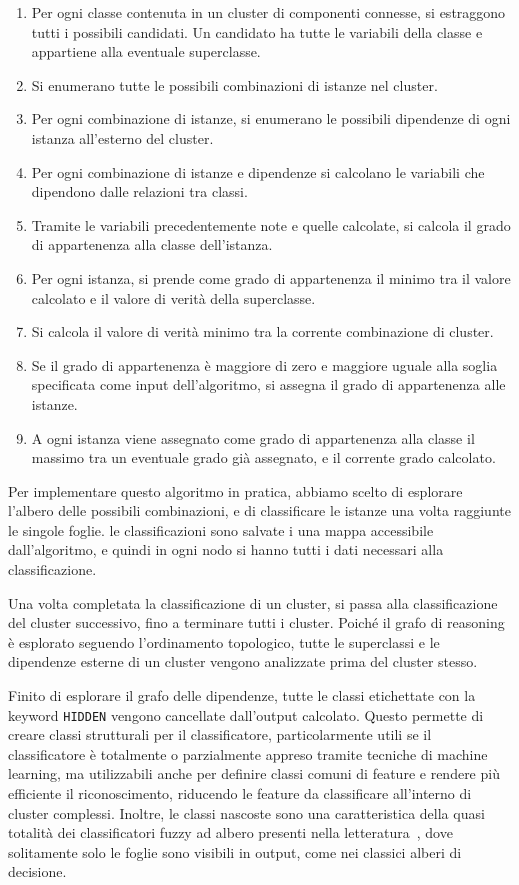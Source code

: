 \begin{enumerate}
 \item Per ogni classe contenuta in un cluster di componenti connesse, si estraggono tutti i possibili candidati. Un candidato ha tutte le variabili della classe e appartiene alla eventuale superclasse.
 \item Si enumerano tutte le possibili combinazioni di istanze nel cluster.
 \item Per ogni combinazione di istanze, si enumerano le possibili dipendenze di ogni istanza all'esterno del cluster.
 \item Per ogni combinazione di istanze e dipendenze si calcolano le variabili che dipendono dalle relazioni tra classi.
 \item Tramite le variabili precedentemente note e quelle calcolate, si calcola il grado di appartenenza alla classe dell'istanza.
 \item Per ogni istanza, si prende come grado di appartenenza il minimo tra il valore calcolato e il valore di verità della superclasse.
 \item Si calcola il valore di verità minimo tra la corrente combinazione di cluster.
 \item Se il grado di appartenenza è maggiore di zero e maggiore uguale alla soglia specificata come input dell'algoritmo, si assegna il grado di appartenenza alle istanze.
 \item A ogni istanza viene assegnato come grado di appartenenza alla classe il massimo tra un eventuale grado già assegnato, e il corrente grado calcolato. 
\end{enumerate}

Per implementare questo algoritmo in pratica, abbiamo scelto di esplorare l'albero delle possibili combinazioni, e di classificare le istanze una volta raggiunte le singole foglie. le classificazioni sono salvate i una mappa accessibile dall'algoritmo, e quindi in ogni nodo si hanno tutti i dati necessari alla classificazione.

Una volta completata la classificazione di un cluster, si passa alla classificazione del cluster successivo, fino a terminare tutti i cluster. Poiché il grafo di reasoning è esplorato seguendo l'ordinamento topologico, tutte le superclassi e le dipendenze esterne di un cluster vengono analizzate prima del cluster stesso.

Finito di esplorare il grafo delle dipendenze, tutte le classi etichettate con la keyword \verb|HIDDEN| vengono cancellate dall'output calcolato. Questo permette di creare classi strutturali per il classificatore, particolarmente utili se il classificatore è totalmente o parzialmente appreso tramite tecniche di machine learning, ma utilizzabili anche per definire classi comuni di feature e rendere più efficiente il riconoscimento, riducendo le feature da classificare all'interno di cluster complessi. Inoltre, le classi nascoste sono una caratteristica della quasi totalità dei classificatori fuzzy ad albero presenti nella letteratura~\cite{Yuan1995125}, dove solitamente solo le foglie sono visibili in output, come nei classici alberi di decisione.





